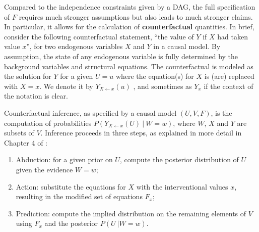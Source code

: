 Compared to the independence constraints given by a DAG, the full
specification of $F$ requires much stronger assumptions but also leads
to much stronger claims. In particular, it allows for the
calculation of {\bf counterfactual} quantities. %
In brief, consider the following counterfactual
statement, ``the value of $Y$ if $X$ had taken value $x$'', for two endogenous
variables $X$ and $Y$ in a causal model. By assumption, the state of
any endogenous variable is fully determined by
the background variables and structural equations. The counterfactual is
modeled as the solution for $Y$ for a given $U = u$ where the equation(s)
for $X$ is (are) replaced with $X = x$.  We denote it by $Y_{X \leftarrow x}(u)$
\cite{pearl:00}, and sometimes as $Y_x$ if the context of the notation is clear.

Counterfactual inference, as specified by a causal model $(U, V, F)$,
is the computation of probabilities $P(Y_{X \leftarrow x}(U)\ |\ W =
w)$, where $W$, $X$ and $Y$ are subsets of $V$. Inference proceeds in
three steps, as explained in more detail in Chapter 4 of
\citet{pearl:16}:
\begin{enumerate}
\item Abduction: for a given prior on $U$, compute the posterior
  distribution of $U$ given the evidence $W = w$;
\item Action: substitute the equations for $X$ with the interventional
  values $x$, resulting in the modified set of equations $F_x$;
\item Prediction: compute the implied distribution on the remaining
  elements of $V$ using $F_x$ and the posterior $P(U\ | W = w)$.
\end{enumerate}



